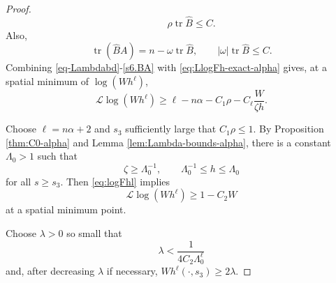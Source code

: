 \documentclass[11pt, reqno]{amsart}
\theoremstyle{remark}
\theoremstyle{definition}
\numberwithin{equation}{section}
\DeclareMathOperator{\tr}{tr}
\begin{document}
\begin{proof}
\begin{equation*}
        \qquad
        \rho\tr\widehat B\le C.
\end{equation*}
Also,
\begin{equation}
        \tr(\widehat B A)
        =n-\omega\tr\widehat B,
        \qquad
        |\omega|\tr\widehat B\le C.
        \label{s6.BA}
\end{equation}
Combining \eqref{eq-Lambdabd}-\eqref{s6.BA} with \eqref{eq:LlogFh-exact-alpha} gives, at a spatial minimum of $\log(Wh^\ell)$,
\begin{equation}\label{eq:logFhl}
        \mathcal L\log(Wh^\ell)
        \ge
        \ell-n\alpha
        -C_1\rho
        -C_\ell\frac{W}{\zeta h}.
\end{equation}


Choose $\ell=n\alpha+2$ and $s_3$ sufficiently large that $C_1\rho\le 1$.  By Proposition \ref{thm:C0-alpha} and Lemma \ref{lem:Lambda-bounds-alpha}, there is a
constant  $\Lambda_0>1$ such that
\begin{equation*}
        \zeta\ge\Lambda_0^{-1},
        \qquad
        \Lambda_0^{-1}\le h\le\Lambda_0
\end{equation*}
for all $s\ge s_3$. Then \eqref{eq:logFhl} implies
\begin{equation*}
    \mathcal L\log(Wh^{\ell})\ge 1-C_2 W
\end{equation*}
at a spatial minimum point.



Choose $\lambda>0$ so small that
\begin{equation*}
        \lambda < \frac{1}{4C_2\Lambda_0^{\ell}}
\end{equation*}
and, after decreasing $\lambda$ if necessary, $ Wh^\ell(\cdot,s_3)\ge 2\lambda$.  


\end{proof}
\end{document}
